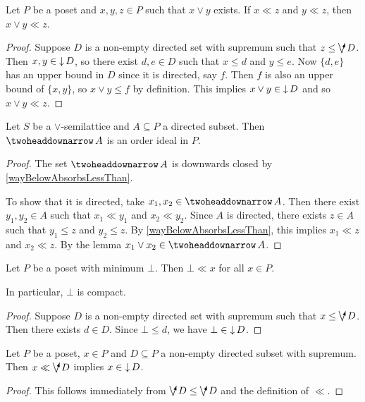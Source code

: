 \begin{lemma} \label{joinWayBelow}
Let $P$ be a poset and $x,y,z\in P$ such that $x\vee y$ exists. If $x\ll z$ and $y \ll z$, then $x\vee y \ll z$.
\end{lemma}
\begin{proof}
Suppose $D$ is a non-empty directed set with supremum such that $z\leq \dirvee D$. Then $x, y\in \operatorname{\downarrow} D$, so there exist $d,e\in D$ such that $x\leq d$ and $y\leq e$. Now $\{d,e\}$ has an upper bound in $D$ since it is directed, say $f$. Then $f$ is also an upper bound of $\{x,y\}$, so $x\vee y \leq f$ by definition. This implies $x\vee y \in \operatorname{\downarrow} D$ and so $x\vee y \ll z$.
\end{proof}
\begin{corollary} \label{ddownsetOrderIdealInJoinSemilattice}
Let $S$ be a $\vee$-semilattice and $A\subseteq P$ a directed subset. Then $\ddownset A$ is an order ideal in $P$.
\end{corollary}
\begin{proof}
The set $\ddownset A$ is downwards closed by \ref{wayBelowAbsorbsLessThan}.

To show that it is directed, take $x_1,x_2 \in \ddownset A$. Then there exist $y_1, y_2\in A$ such that $x_1 \ll y_1$ and $x_2 \ll y_2$. Since $A$ is directed, there exists $z\in A$ such that $y_1\leq z$ and $y_2\leq z$. By \ref{wayBelowAbsorbsLessThan}, this implies $x_1 \ll z$ and $x_2 \ll z$. By the lemma $x_1\vee x_2 \in \ddownset A$.
\end{proof}

\begin{lemma}
Let $P$ be a poset with minimum $\bot$. Then $\bot \ll x$ for all $x\in P$.
\end{lemma}
In particular, $\bot$ is compact.
\begin{proof}
Suppose $D$ is a non-empty directed set with supremum such that $x\leq \dirvee D$. Then there exists $d\in D$. Since $\bot \leq d$, we have $\bot \in\operatorname{\downarrow} D$. 
\end{proof}

\begin{lemma} \label{wayBelowDirectedSup}
Let $P$ be a poset, $x\in P$ and $D\subseteq P$ a non-empty directed subset with supremum. Then $x \ll \dirvee D$ implies $x\in \operatorname{\downarrow} D$.
\end{lemma}
\begin{proof}
This follows immediately from $\dirvee D \leq \dirvee D$ and the definition of $\ll$.
\end{proof}

